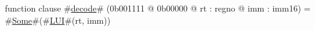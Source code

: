 function clause #\hyperref[zdecode]{decode}# (0b001111 @ 0b00000 @ rt : regno @ imm : imm16) =
  #\hyperref[zSome]{Some}#(#\hyperref[zLUI]{LUI}#(rt, imm))

